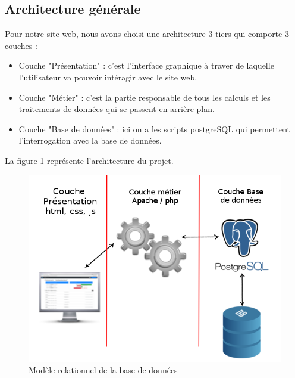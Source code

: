 \documentclass[a4paper, 11pt]{article}
\begin{document}
\subsection{Architecture générale}
Pour notre site web, nous avons choisi une architecture 3 tiers qui comporte 3 couches : 
\begin{itemize}
	\item Couche "Présentation" : c'est l'interface graphique à traver de laquelle l'utilisateur va pouvoir intéragir avec le site web.
	\item Couche "Métier" : c'est la partie responsable de tous les calculs et les traitements de données qui se passent en arrière plan.
	\item Couche "Base de données" : ici on a les scripts postgreSQL qui permettent l'interrogation avec la base de données.
\end{itemize}
La figure \ref{fig:architecture} représente l'architecture du projet.

\begin{figure}[!ht]
	\includegraphics[scale=.9]{images/architecture.png}
	\caption{Modèle relationnel de la base de données}
	\label{fig:architecture}
\end{figure}
\end{document}

